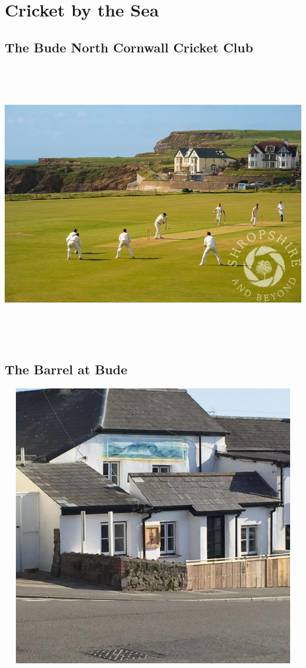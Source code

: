 \documentclass[]{article}
\begin{document}
\section{Cricket by the Sea}\label{cricket-by-the-sea}

\subsection{\texorpdfstring{\textbf{The Bude North Cornwall Cricket
Club}}{The Bude North Cornwall Cricket Club}}\label{the-bude-north-cornwall-cricket-club}

\includegraphics[width=400pt,height=350pt]{BudeNorthCornwallCricketClub.jpg}

\subsection{\texorpdfstring{\textbf{The Barrel at
Bude}}{The Barrel at Bude}}\label{the-barrel-at-bude}

\includegraphics[width=400pt,height=350pt]{TheBarrelatBude.jpg}
\end{document}
